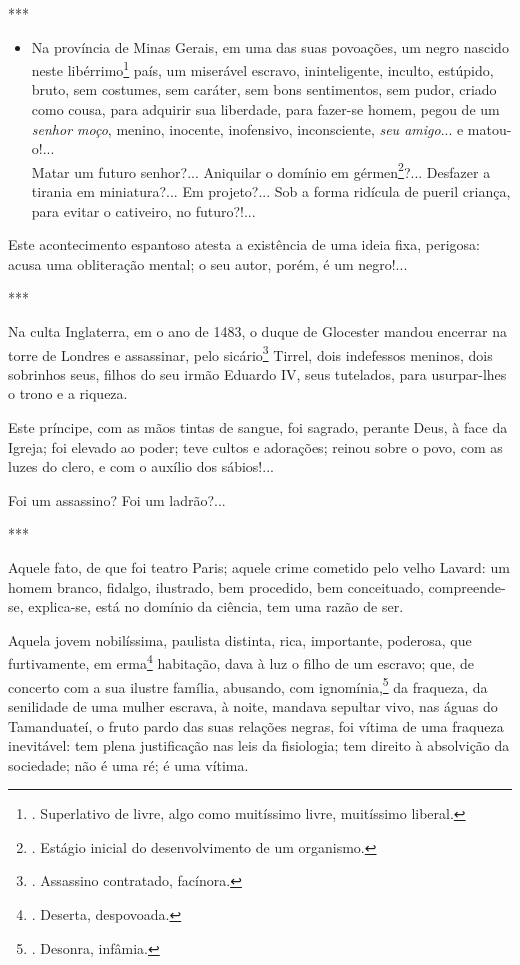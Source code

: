 ***

\begin{itemize}
\item
  Na província de Minas Gerais, em uma das suas povoações, um negro
  nascido neste libérrimo\footnote{. Superlativo de livre, algo como
    muitíssimo livre, muitíssimo liberal.} país, um miserável escravo,
  ininteligente, inculto, estúpido, bruto, sem costumes, sem caráter,
  sem bons sentimentos, sem pudor, criado como cousa, para adquirir sua
  liberdade, para fazer-se homem, pegou de um \emph{senhor moço},
  menino, inocente, inofensivo, inconsciente, \emph{seu amigo}... e
  matou-o!...\\
  Matar um futuro senhor?... Aniquilar o domínio em gérmen\footnote{.
    Estágio inicial do desenvolvimento de um organismo.}?... Desfazer a
  tirania em miniatura?... Em projeto?... Sob a forma ridícula de pueril
  criança, para evitar o cativeiro, no futuro?!...
\end{itemize}

Este acontecimento espantoso atesta a existência de uma ideia fixa,
perigosa: acusa uma obliteração mental; o seu autor, porém, é um
negro!...

***

Na culta Inglaterra, em o ano de 1483, o duque de Glocester mandou
encerrar na torre de Londres e assassinar, pelo sicário\footnote{.
  Assassino contratado, facínora.} Tirrel, dois indefessos meninos, dois
sobrinhos seus, filhos do seu irmão Eduardo IV, seus tutelados, para
usurpar-lhes o trono e a riqueza.

Este príncipe, com as mãos tintas de sangue, foi sagrado, perante Deus,
à face da Igreja; foi elevado ao poder; teve cultos e adorações; reinou
sobre o povo, com as luzes do clero, e com o auxílio dos sábios!...

Foi um assassino? Foi um ladrão?...

***

Aquele fato, de que foi teatro Paris; aquele crime cometido pelo velho
Lavard: um homem branco, fidalgo, ilustrado, bem procedido, bem
conceituado, compreende-se, explica-se, está no domínio da ciência, tem
uma razão de ser.

Aquela jovem nobilíssima, paulista distinta, rica, importante, poderosa,
que furtivamente, em erma\footnote{. Deserta, despovoada.} habitação,
dava à luz o filho de um escravo; que, de concerto com a sua ilustre
família, abusando, com ignomínia,\footnote{. Desonra, infâmia.} da
fraqueza, da senilidade de uma mulher escrava, à noite, mandava sepultar
vivo, nas águas do Tamanduateí, o fruto pardo das suas relações negras,
foi vítima de uma fraqueza inevitável: tem plena justificação nas leis
da fisiologia; tem direito à absolvição da sociedade; não é uma ré; é
uma vítima.

